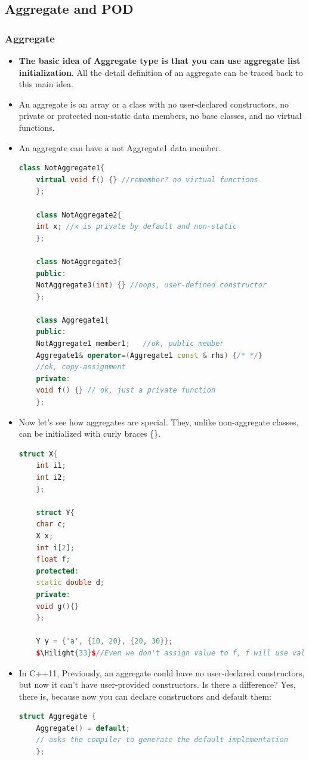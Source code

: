 \documentclass[a4paper,11pt,twoside]{book}
\newcommand{\Hilight}[1]{\makebox[0pt][l]{\color{yellow}\rule[-3pt]{#1em}{11pt}}}
\newcommand{\Hilight}[1]{}
\begin{document}
\subsection{Aggregate and POD}
\subsubsection{Aggregate}
\begin{itemize}
	\item \textbf{The basic idea of Aggregate type is that you can use aggregate list initialization}. All the detail definition of an aggregate can be traced back to this main idea. 
	
	\item An aggregate is an array or a class with no user-declared constructors, no private or protected non-static data members, no base classes, and no virtual functions.
	
	\item  An aggregate can have a not Aggregate1 data member.
	\begin{lstlisting}[frame=single, language=c++]
	class NotAggregate1{
	virtual void f() {} //remember? no virtual functions
	};
	
	class NotAggregate2{
	int x; //x is private by default and non-static 
	};
	
	class NotAggregate3{
	public:
	NotAggregate3(int) {} //oops, user-defined constructor
	};
	
	class Aggregate1{
	public:
	NotAggregate1 member1;   //ok, public member
	Aggregate1& operator=(Aggregate1 const & rhs) {/* */} 
	//ok, copy-assignment  
	private:
	void f() {} // ok, just a private function
	};
	\end{lstlisting}
	
	\item Now let's see how aggregates are special. They, unlike non-aggregate classes, can be initialized with curly braces \{\}. 
	\begin{lstlisting}[frame=single, language=c++]
	struct X{
	int i1;
	int i2;
	};
	
	struct Y{
	char c;
	X x;
	int i[2];
	float f; 
	protected:
	static double d;
	private:
	void g(){}      
	}; 
	
	Y y = {'a', {10, 20}, {20, 30}};
	$\Hilight{33}$//Even we don't assign value to f, f will use value init. 
	\end{lstlisting}
	
	\item In C++11, Previously, an aggregate could have no user-declared constructors, but now it can't have user-provided constructors. Is there a difference? Yes, there is, because now you can declare constructors and default them:
	\begin{lstlisting}[frame=single, language=c++]
	struct Aggregate {
	Aggregate() = default; 
	// asks the compiler to generate the default implementation
	};
	\end{lstlisting}
	

\end{itemize}
\end{document}
